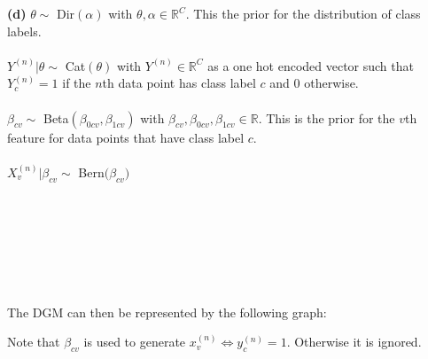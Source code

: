 \documentclass[submit]{harvardml}
\newcommand{\R}{\mathbb{R}}
\begin{document}
\textbf{(d)} $\theta\sim$ Dir$(\alpha)$ with $\theta,\alpha\in\R^C$. This the prior for the distribution of class labels.\\\\
$Y^{(n)}|\theta\sim$ Cat$(\theta)$ with $Y^{(n)}\in\R^C$ as a one hot encoded vector such that $Y_c^{(n)}=1$ if the $n$th data point has class label $c$ and $0$ otherwise.\\\\
$\beta_{cv}\sim$ Beta$(\beta_{0cv},\beta_{1cv})$ with $\beta_{cv},\beta_{0cv},\beta_{1cv}\in\R$. This is the prior for the $v$th feature for data points that have class label $c$.\\\\
$X_v^{(n)}|\beta_{cv}\sim$ Bern$\big(\beta_{cv}\big)$\\\\\\\\\\\\\\\\
The DGM can then be represented by the following graph:
\begin{center}
\end{center}
Note that $\beta_{cv}$ is used to generate $x_v^{(n)}\Leftrightarrow y^{(n)}_c = 1$. Otherwise it is ignored.\\\\
\end{document}
